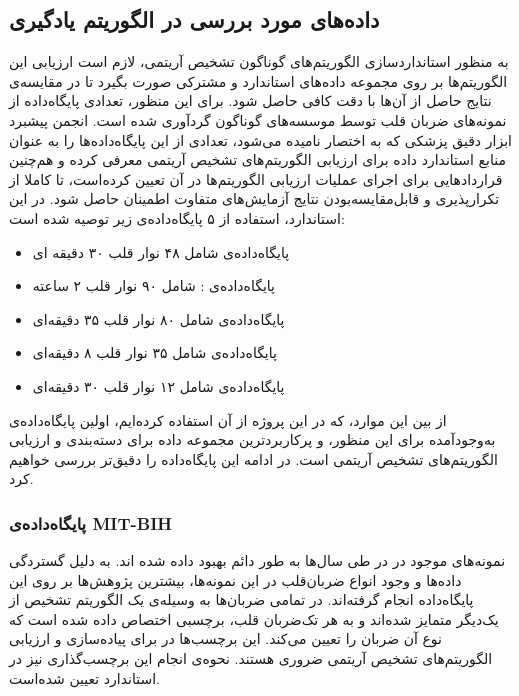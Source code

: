 	\subsection{داده‌های مورد بررسی در الگوریتم یادگیری}
	به منظور استانداردسازی الگوریتم‌های گوناگون تشخیص آریتمی، لازم است ارزیابی این الگوریتم‌ها بر روی مجموعه داده‌های استاندارد و مشترکی صورت بگیرد تا در مقایسه‌ی نتایج حاصل از آن‌ها با دقت کافی حاصل شود. برای این منظور، تعدادی پایگاه‌داده از نمونه‌های ضربان قلب توسط موسسه‌های گوناگون گردآوری شده است. انجمن پیشبرد ابزار دقیق پزشکی که به اختصار  نامیده می‌شود، تعدادی از این پایگاه‌داده‌ها را به عنوان منابع استاندارد داده برای ارزیابی الگوریتم‌های تشخیص آریتمی معرفی کرده و هم‌چنین قراردادهایی برای اجرای عملیات ارزیابی الگوریتم‌ها در آن تعیین کرده‌است، تا کاملا از تکرارپذیری و قابل‌مقایسه‌بودن نتایج آزمایش‌های متفاوت اطمینان حاصل شود. در این استاندارد، استفاده از ۵ پایگاه‌داده‌ی زیر توصیه شده است:
\begin{itemize}
	\item پایگاه‌داده‌ی  شامل ۴۸ نوار قلب ۳۰ دقیقه ای
	\item پایگاه‌داده‌ی : شامل ۹۰ نوار قلب ۲ ساعته
	\item پایگاه‌داده‌ی  شامل ۸۰ نوار قلب ۳۵ دقیقه‌ای
	\item پایگاه‌داده‌ی  شامل ۳۵ نوار قلب ۸ دقیقه‌ای
	\item پایگاه‌داده‌ی  شامل ۱۲ نوار قلب ۳۰ دقیقه‌ای
\end{itemize}	 
از بین این موارد،  که در این پروژه از آن استفاده کرده‌ایم، اولین پایگاه‌داده‌ی به‌وجودآمده برای این منظور، و پرکاربردترین مجموعه داده برای دسته‌بندی و ارزیابی الگوریتم‌های تشخیص آریتمی است.\cite{ECGSurvey} در ادامه این پایگاه‌داده را دقیق‌تر بررسی خواهیم کرد. 


		\subsubsection{پایگاه‌داده‌ی MIT-BIH}
		نمونه‌های موجود در  در طی سال‌ها به طور دائم بهبود داده شده اند. به دلیل گستردگی داده‌ها و وجود انواع ضربان‌قلب در این نمونه‌‌ها، بیشترین پژوهش‌ها بر روی این پایگاه‌داده‌ انجام گرفته‌اند.\cite{ECGSurvey} 
در  تمامی ضربان‌ها به وسیله‌ی یک الگوریتم تشخیص  از یک‌دیگر متمایز شده‌اند و به هر تک‌ضربان قلب، برچسبی اختصاص داده شده است که نوع آن ضربان  را تعیین می‌کند. این برچسب‌ها در برای پیاده‌سازی و ارزیابی الگوریتم‌های تشخیص آریتمی ضروری هستند. نحوه‌ی انجام این برچسب‌گذاری نیز در استاندارد  تعیین شده‌است.

